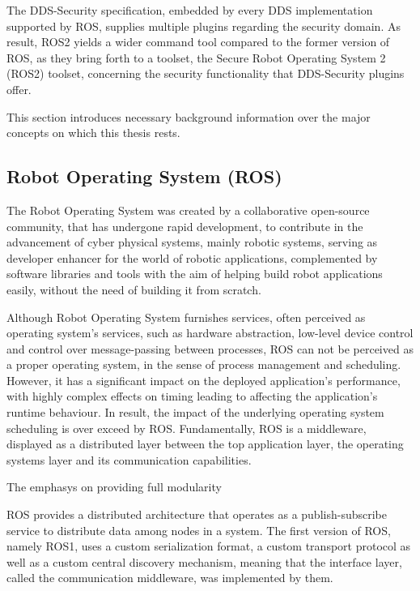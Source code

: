The DDS-Security specification\cite{ros-dds-integration}, embedded by every DDS implementation supported by ROS, supplies multiple plugins regarding the security domain. As result, ROS2 yields a wider command tool compared to the former version of ROS, as they bring forth to a toolset, the Secure Robot Operating System 2 (ROS2) toolset, concerning the security functionality that DDS-Security plugins offer.

This section introduces necessary background information over the major concepts on which this thesis rests. 


\subsection{Robot Operating System (ROS)}

The Robot Operating System was created by a collaborative open-source community, that has undergone rapid development, to contribute in the advancement of cyber physical systems, mainly robotic systems, serving as developer enhancer for the world of robotic applications\cite{diluoffo2018robot}, complemented by software libraries and tools with the aim of helping build robot applications easily, without the need of building it from scratch.

Although Robot Operating System furnishes services, often perceived as operating system's services, such as hardware abstraction, low-level device control and control over message-passing between processes, ROS can not be perceived as a proper operating system, in the sense of process management and scheduling. However, it has a significant impact on the deployed application's performance, with highly complex effects on timing leading to affecting the application's runtime behaviour. In result, the impact of the underlying operating system scheduling is over exceed by ROS.\cite{intro-ros, casini2019response} Fundamentally, ROS is a middleware, displayed as a distributed layer between the top application layer, the operating systems layer and its communication capabilities. 

The emphasys on providing full modularity

ROS provides a distributed architecture that operates as a publish-subscribe service to distribute data among nodes in a system. The first version of ROS, namely ROS1, uses a custom serialization format, a custom transport protocol as well as a custom central discovery mechanism, meaning that the interface layer, called the communication middleware, was implemented by them. 
            
